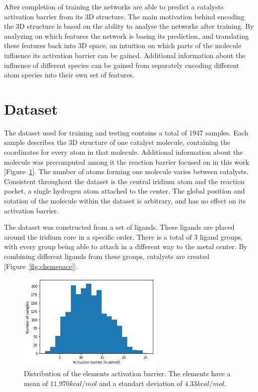 After completion of training the networks are able to predict a catalysts activation barrier from its 3D structure.
The main motivation behind encoding the 3D structure is based on the ability to analyse the networks after training.
By analyzing on which features the network is basing its prediction, and translating these features back into 
3D space, an intuition on which parts of the molecule influence its activation barrier can be gained.
Additional information about the influence of different species can be gained 
from separately encoding different atom species into their own set of features.

\section{Dataset}

The dataset used for training and testing contains a total of 1947 samples.
Each sample describes the 3D structure of one catalyst molecule, 
containing the coordinates for every atom in that molecule.
Additional information about the molecule was precomputed among it the reaction barrier focused on in this work [Figure~\ref{fig:barriers}]. %
The number of atoms forming one molecule varies between catalysts.
Consistent throughout the dataset is the central iridium atom and the reaction pocket, a single hydrogen atom attached to the center.
The global position and rotation of the molecule within the dataset is arbitrary, and has no effect on its activation barrier.

The dataset was constructed from a set of ligands.
These ligands are placed around the iridium core in a specific order.
There is a total of 3 ligand groups, with every group being able to attach in a different way to the metal center.
By combining different ligands from these groups, catalysts are created [Figure~\ref{fig:chemspace}].

\begin{figure}[H]
  \centering
  \includegraphics[width=7cm]{figures/introduction/barrier.png}
  \caption[Distribution of activation barriers]{Distribution of the elements activation barrier. The elements have a mean of $11.970 kcal/mol$ and a standart deviation of $4.33 kcal/mol$.}
  \label{fig:barriers}
\end{figure}

